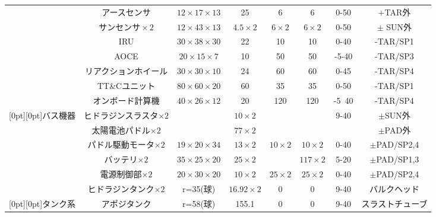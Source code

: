 \documentclass[15pt,uplatex,dvipdfmx]{jsarticle}
\begin{document}
\begin{table}[H]
\begin{tabularx}{55zw}{c|c c c C C C c }
  & アースセンサ & $12 \times 17 \times 13$ & 25 & 6 & 6 & 0-50 & +TAR外\\ 
  & $サンセンサ \times 2$ & $12 \times 43 \times 13$ & $4.5 \times 2$ & $6 \times 2$
  & $6 \times 2$ & 0-50 & $\pm$ SUN外\\ 
  & IRU & $30 \times 38 \times 30$ & 22 & 10 & 10 & 0-40 & -TAR/SP1\\ 
  & AOCE & $20 \times 15 \times 7$ & 10 & 50 & 50 & -5-40 & -TAR/SP3\\ 
  & リアクションホイール & $30 \times 30 \times 10$ & 24 & 60 & 60 & 0-45 & -TAR/SP4 \\ 
  & TT\&Cユニット & $80 \times 60 \times 20$ & 60 & 35 & 35 & 0-50 & -TAR/SP1\\ 
  & オンボード計算機 & $40 \times 26 \times 12$ & 20 & 120 & 120 & -5~40 & -TAR/SP4\\ 
  \raisebox{.5\normalbaselineskip}[0pt][0pt]{バス機器}
  & ヒドラジンスラスタ$\times 2$ &  & $10 \times 2$ &  &  & 9-40 & $\pm$SUN外 \\ 
  & 太陽電池パドル$\times 2$ &  & $77 \times 2$ &  &  &  & $\pm$PAD外 \\ 
  & パドル駆動モータ$\times 2$ & $19 \times 20 \times 34$ & $13 \times 2$ & $10 \times 2$ & $10 \times 2$ & 0-40 & $\pm$PAD/SP2,4 \\ 
  & バッテリ$\times 2$ & $35 \times 25 \times 20$ & $25 \times 2$ &  & $117 \times 2$ & 5-20 & $\pm$PAD/SP1,3  \\ 
  & 電源制御部$\times 2$ & $20 \times 30 \times 20$ & $10 \times 2$ & $25 \times 2$ & $25 \times 2$ & 0-40 & $\pm$PAD/SP2,4\\ \hline

  & ヒドラジンタンク$\times 2$ & r=35(球) & $16.92 \times 2$ & 0 & 0 & 9-40 & バルクヘッド \\ 
  \raisebox{.5\normalbaselineskip}[0pt][0pt]{タンク系}
  & アポジタンク & r=58(球) & 155.1 & 0 & 0 & 9-40 & スラストチューブ \\ \hline

\end{tabularx}
\end{table}
\newpage
\end{document}
